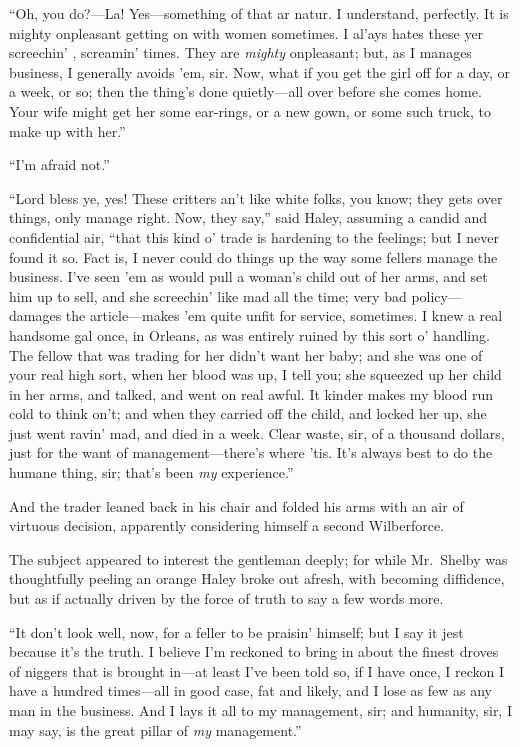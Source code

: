 ``Oh, you do?---La! Yes---something of that ar natur. I understand, perfectly.
It is mighty onpleasant getting on with women sometimes. I al'ays hates these
yer screechin' , screamin' times. They are \emph{mighty} onpleasant; but, as I
manages business, I generally avoids 'em, sir. Now, what if you get the girl off
for a day, or a week, or so; then the thing's done quietly---all over before she
comes home. Your wife might get her some ear-rings, or a new gown, or some such
truck, to make up with her.''
    
``I'm afraid not.''

``Lord bless ye, yes! These critters an't like white folks, you know; they gets
over things, only manage right. Now, they say,'' said Haley, assuming a candid
and confidential air, ``that this kind o' trade is hardening to the feelings;
but I never found it so. Fact is, I never could do things up the way some
fellers manage the business. I've seen 'em as would pull a woman's child out of
her arms, and set him up to sell, and she screechin' like mad all the time; very
bad policy---damages the article---makes 'em quite unfit for service, sometimes.
I knew a real handsome gal once, in Orleans, as was entirely ruined by this sort
o' handling. The fellow that was trading for her didn't want her baby; and she
was one of your real high sort, when her blood was up, I tell you; she squeezed
up her child in her arms, and talked, and went on real awful. It kinder makes my
blood run cold to think on't; and when they carried off the child, and locked
her up, she just went ravin' mad, and died in a week. Clear waste, sir, of a
thousand dollars, just for the want of management---there's where 'tis. It's
always best to do the humane thing, sir; that's been \emph{my} experience.''

And the trader leaned back in his chair and folded his arms with an air of
virtuous decision, apparently considering himself a second Wilberforce.

The subject appeared to interest the gentleman deeply; for while Mr.\ Shelby was
thoughtfully peeling an orange Haley broke out afresh, with becoming diffidence,
but as if actually driven by the force of truth to say a few words more.

``It don't look well, now, for a feller to be praisin' himself; but I say it
jest because it's the truth. I believe I'm reckoned to bring in about the finest
droves of niggers that is brought in---at least I've been told so, if I have
once, I reckon I have a hundred times---all in good case, fat and likely, and I
lose as few as any man in the business. And I lays it all to my management, sir;
and humanity, sir, I may say, is the great pillar of \emph{my} management.''

